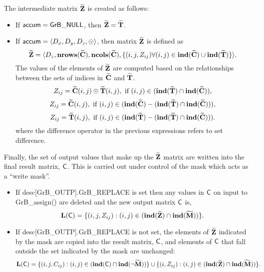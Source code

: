 The intermediate matrix ${\bf \widetilde{Z}}$ is created as follows:
\begin{itemize}
    \item If ${\sf accum} = {\sf GrB\_NULL}$, then 
    ${\bf \widetilde{Z}} = {\bf \widetilde{T}}$.

    \item If ${\sf accum} = \langle D_x, D_y, D_z, \odot \rangle$, then matrix 
    ${\bf \widetilde{Z}}$ is defined as 
        \[ 
        {\bf \widetilde{Z}} =
        \langle D_z, \bold{nrows}({\bf \widetilde{C}}),
        \bold{ncols}({\bf \widetilde{C}}), 
		\{(i,j,Z_{ij})  \forall (i,j) \in \bold{ind}({\bf \widetilde{C}}) \cup 
        \bold{ind}({\bf \widetilde{T}}) \} \rangle.\]
    The values of the elements of ${\bf \widetilde{Z}}$ are computed based on 
    the relationships between the sets of indices in ${\bf \widetilde{C}}$ and 
    ${\bf \widetilde{T}}$.
\[
	Z_{ij} = {\bf \widetilde{C}}(i,j) \odot {\bf \widetilde{T}}(i,j), 
    \mbox{~if~} (i,j) \in  (\bold{ind}({\bf \widetilde{T}}) \cap 
    \bold{ind}({\bf \widetilde{C}})),
\]
\[
	Z_{ij} = {\bf \widetilde{C}}(i,j), \mbox{~if~}  (i,j) \in  
    (\bold{ind}({\bf \widetilde{C}}) - (\bold{ind}({\bf \widetilde{T}}) \cap 
    \bold{ind}({\bf \widetilde{C}}))),
\]
\[
	Z_{ij} = {\bf \widetilde{T}}(i,j), \mbox{~if~}  (i,j) \in  
    (\bold{ind}({\bf \widetilde{T}}) - (\bold{ind}({\bf \widetilde{T}}) \cap 
    \bold{ind}({\bf \widetilde{C}}))).
\]
where the difference operator in the previous expressions refers to set difference.
\end{itemize}

Finally, the set of output values that make up the ${\bf \widetilde{Z}}$ 
matrix are written into the final result matrix, ${\sf C}$. 
This is carried out under control of the mask which acts as a ``write mask''.
\begin{itemize}
\item If {\sf desc[GrB\_OUTP].GrB\_REPLACE} is set then any values in ${\sf C}$ 
on input to {\sf GrB\_assign()} are deleted and the new output matrix ${\sf C}$ is,
		\[ \bold{L}({\sf C}) = \{(i,j,Z_{ij}) : (i,j) \in (\bold{ind}({\bf \widetilde{Z}}) 
\cap \bold{ind}({\bf \widetilde{M}})) \}. \]

\item If {\sf desc[GrB\_OUTP].GrB\_REPLACE} is not set, the elements of 
${\bf \widetilde{Z}}$ indicated by 
the mask are copied into the result matrix, ${\sf C}$, and elements of 
${\sf C}$ that fall outside the set indicated by the mask are unchanged:
		\[ \bold{L}({\sf C}) = \{(i,j,C_{ij}) : (i,j) \in (\bold{ind}({\bf \sf C}) 
		\cap \bold{ind}(\neg {\bf \widetilde{M}})) \} \cup \{(i,Z_{ij}) : (i,j) \in 
(\bold{ind}({\bf \widetilde{Z}}) \cap \bold{ind}({\bf \widetilde{M}})) \}. \]
\end{itemize}

